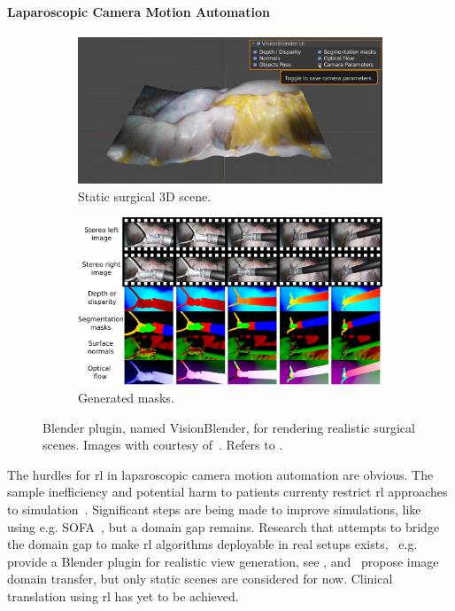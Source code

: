 \paragraph{Laparoscopic Camera Motion Automation}
\begin{figure}[tb]
    \centering
    \begin{subfigure}[b]{0.49\textwidth}
        \includegraphics[width=\textwidth]{introduction/img/vision_blender_view.jpg}
        \caption{Static surgical 3D scene.}
    \end{subfigure}
    \begin{subfigure}[b]{0.49\textwidth}
        \includegraphics[width=\textwidth]{introduction/img/vision_blender_masks.jpg}
        \caption{Generated masks.}
    \end{subfigure}
    \caption{Blender plugin, named VisionBlender, for rendering realistic surgical scenes. Images with courtesy of~\cite{cartucho2021visionblender}. Refers to .}
    \label{in:fig:vision_blender}
\end{figure}
The hurdles for \gls{rl} in laparoscopic camera motion automation are obvious. The sample inefficiency and potential harm to patients currenty restrict \gls{rl} approaches to simulation~\cite{su2021multicamera,agrawal2018automating}. Significant steps are being made to improve simulations, like~\cite{scheikl2023lapgym} using e.g. SOFA~\cite{allard2007sofa}, but a domain gap remains. Research that attempts to bridge the domain gap to make \gls{rl} algorithms deployable in real setups exists,~\cite{cartucho2021visionblender} e.g. provide a Blender plugin for realistic view generation, see , and~\cite{marzullo2021towards} propose image domain transfer, but only static scenes are considered for now. Clinical translation using \gls{rl} has yet to be achieved.

